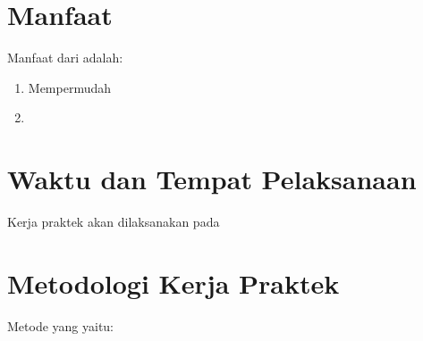 \section{Manfaat}
\vspace{1ex}

Manfaat dari \lipsum[1][1] adalah:
\vspace{0.5ex}

\begin{enumerate}[nolistsep]

  \item Mempermudah \lipsum[1][1-2]
  \vspace{0.5ex}

  \item \lipsum[1][3-4]
  \vspace{0.5ex}

\end{enumerate}
\vspace{0.5ex}

\section{Waktu dan Tempat Pelaksanaan}
\vspace{1ex}

Kerja praktek akan dilaksanakan pada \lipsum[1][1-3]
\vspace{0.5ex}

\section{Metodologi Kerja Praktek}
\vspace{1ex}

Metode yang \lipsum[1][1] yaitu:
\vspace{0.5ex}

